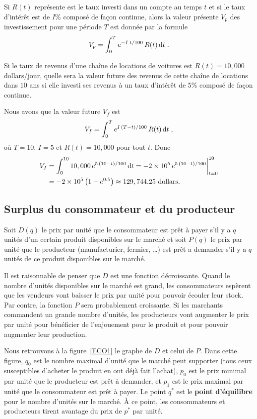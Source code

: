 {\begin{meth} 
Si $R(t)$ représente est le taux investi dans un compte au temps $t$
et si le taux d'intérêt est de $I$\% composé de façon continue, alors la
valeur présente $V_p$ des investissement pour une période $T$ est
donnée par la formule
\[
V_p = \int_0^T e^{-I\;t/100} \,R(t) \,\mathrm{d}t \; .
\]
\end{meth}

\begin{egg}
Si le taux de revenus d'une chaîne de locations de voitures est
$R(t) = 10,000$ dollars/jour, quelle sera la valeur future des revenus
de cette chaîne de locations dans $10$ ans si elle investi ses revenus
à un taux d'intérêt de $5$\% composé de façon continue.

Nous avons que la valeur future $V_f$ est
\[
V_f = \int_0^T e^{I\,(T-t)/100} \,R(t) \,\mathrm{d}t \; ,
\]
où $T=10$, $I=5$ et $R(t)=10,000$ pour tout $t$.  Donc
\begin{align*}
V_f &= \int_0^{10} 10,000\, e^{5\,(10-t)/100} \,\mathrm{d}t
= -2\times 10^5\, e^{5\,(10-t)/100} \bigg|_{t=0}^{10} \\
&= -2\times 10^5 \left(1-e^{0.5}\right) \approx 129,744.25 \text{ dollars}.
\end{align*}
\end{egg}

\subsection{Surplus du consommateur et du producteur} 

Soit $D(q)$ le prix par unité que le consommateur est prêt à payer s'il y a
$q$ unités d'un certain produit disponibles sur le marché et soit
$P(q)$ le prix par unité que le producteur (manufacturier, fermier,
\ldots) est prêt a demander s'il y a $q$ unités de ce produit
disponibles sur le marché.

Il est raisonnable de penser que $D$ est une fonction décroissante.
Quand le nombre d'unités disponibles sur le marché est grand, les
consommateurs espèrent que les vendeurs vont baisser le prix par unité
pour pouvoir écouler leur stock.  Par contre, la fonction $P$ sera
probablement croissante.  Si les marchants commandent un grande nombre
d'unités, les producteurs vont augmenter le prix par unité pour
bénéficier de l'enjouement pour le produit et pour pouvoir augmenter
leur production.

Nous retrouvons à la figure~\ref{ECO1} le graphe de $D$ et celui de $P$.  Dans
cette figure, $q_0$ est le nombre maximal d'unité que le marché peut
supporter (tous ceux susceptibles d'acheter le produit en ont déjà fait
l'achat), $p_0$ est le prix minimal par unité que le producteur est
prêt à demander, et $p_1$ est le prix maximal par unité que le
consommateur est prêt à payer.  Le point $q^\ast$ est le
{\bfseries point d'équilibre} pour le nombre d'unités sur le marché.  À ce
point, les consommateurs et producteurs tirent avantage
du prix de $p^\ast$ par unité.

}
